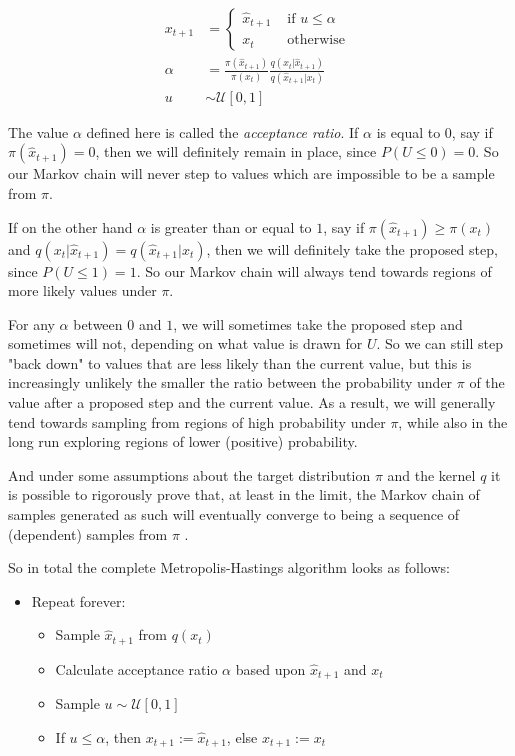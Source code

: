 \begin{align*}
x_{t+1} & = \begin{cases}
    \hat{x}_{t+1} & \text{ if } u \le \alpha \\
            x_{t} & \text{ otherwise }
            \end{cases} \\
\alpha & = \frac{\pi(\hat{x}_{t+1})}{\pi(x_t)} \frac{q(x_t | \hat{x}_{t+1})}{q(\hat{x}_{t+1} | x_t)} \\
u & \sim \mathcal{U}[0,1]
\end{align*}

The value $\alpha$ defined here is called the \textit{acceptance ratio}. If $\alpha$ is equal to $0$, say if $\pi(\hat{x}_{t+1}) = 0$, then we will definitely remain in place, since $P(U \le 0) = 0$. So our Markov chain will never step to values which are impossible to be a sample from $\pi$.

If on the other hand $\alpha$ is greater than or equal to $1$, say if $\pi(\hat{x}_{t+1}) \ge {\pi(x_t)}$ and $q(x_t | \hat{x}_{t+1}) = q(\hat{x}_{t+1} | x_t)$, then we will definitely take the proposed step, since $P(U \le 1) = 1$. So our Markov chain will always tend towards regions of more likely values under $\pi$.

For any $\alpha$ between $0$ and $1$, we will sometimes take the proposed step and sometimes will not, depending on what value is drawn for $U$. So we can still step "back down" to values that are less likely than the current value, but this is increasingly unlikely the smaller the ratio between the probability under $\pi$ of the value after a proposed step and the current value. As a result, we will generally tend towards sampling from regions of high probability under $\pi$, while also in the long run exploring regions of lower (positive) probability.

And under some assumptions about the target distribution $\pi$ and the kernel $q$ it is possible to rigorously prove that, at least in the limit, the Markov chain of samples generated as such will eventually converge to being a sequence of (dependent) samples from $\pi$ \cite{metropolis1953equation}.

So in total the complete Metropolis-Hastings algorithm looks as follows:

\begin{minipage}{\linewidth}
\begin{itemize}
\item Repeat forever:
  \begin{itemize}
  \item Sample $\hat{x}_{t+1}$ from $q(x_t)$
  \item Calculate acceptance ratio $\alpha$ based upon $\hat{x}_{t+1}$ and $x_t$
  \item Sample $u \sim \mathcal{U}[0,1]$
  \item If $u \le \alpha$, then $x_{t+1} := \hat{x}_{t+1}$, else $x_{t+1} := x_t$
  \end{itemize}
\end{itemize}
\end{minipage}

